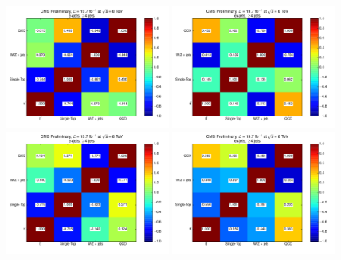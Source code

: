 \begin{figure}[hbtp]
    \centering
     \includegraphics[width=0.48\textwidth]{Chapters/04_Analysis/04b_XSections/images/fitchecks/8TeV/Correlations_electron_MET_0-27.pdf}\hfill    
     \includegraphics[width=0.48\textwidth]{Chapters/04_Analysis/04b_XSections/images/fitchecks/8TeV/Correlations_electron_MET_27-52.pdf}\\
	 \includegraphics[width=0.48\textwidth]{Chapters/04_Analysis/04b_XSections/images/fitchecks/8TeV/Correlations_electron_MET_52-87.pdf}\hfill
	 \includegraphics[width=0.48\textwidth]{Chapters/04_Analysis/04b_XSections/images/fitchecks/8TeV/Correlations_electron_MET_87-130.pdf}\\

\end{figure}
